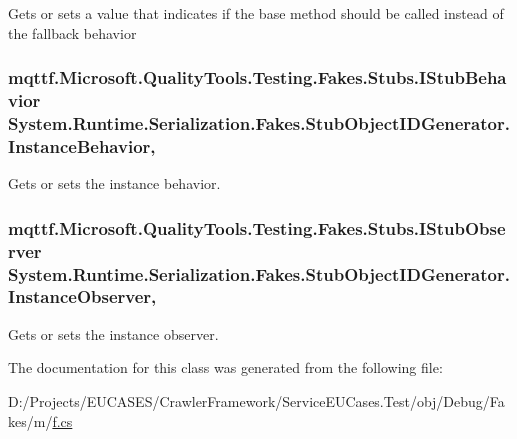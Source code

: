 Gets or sets a value that indicates if the base method should be called instead of the fallback behavior

\hypertarget{class_system_1_1_runtime_1_1_serialization_1_1_fakes_1_1_stub_object_i_d_generator_a65f2233368d97d94e368ef644f011914}{
\subsubsection[{Instance\-Behavior}]{\setlength{\rightskip}{0pt plus 5cm}mqttf.\-Microsoft.\-Quality\-Tools.\-Testing.\-Fakes.\-Stubs.\-I\-Stub\-Behavior System.\-Runtime.\-Serialization.\-Fakes.\-Stub\-Object\-I\-D\-Generator.\-Instance\-Behavior\hspace{0.3cm}{\ttfamily [get]}, {\ttfamily [set]}}}\label{class_system_1_1_runtime_1_1_serialization_1_1_fakes_1_1_stub_object_i_d_generator_a65f2233368d97d94e368ef644f011914}


Gets or sets the instance behavior.

\hypertarget{class_system_1_1_runtime_1_1_serialization_1_1_fakes_1_1_stub_object_i_d_generator_a2ca6d8c4e19b1d65dd3e245b6fafd203}{
\subsubsection[{Instance\-Observer}]{\setlength{\rightskip}{0pt plus 5cm}mqttf.\-Microsoft.\-Quality\-Tools.\-Testing.\-Fakes.\-Stubs.\-I\-Stub\-Observer System.\-Runtime.\-Serialization.\-Fakes.\-Stub\-Object\-I\-D\-Generator.\-Instance\-Observer\hspace{0.3cm}{\ttfamily [get]}, {\ttfamily [set]}}}\label{class_system_1_1_runtime_1_1_serialization_1_1_fakes_1_1_stub_object_i_d_generator_a2ca6d8c4e19b1d65dd3e245b6fafd203}


Gets or sets the instance observer.



The documentation for this class was generated from the following file\-:\begin{DoxyCompactItemize}
\item 
D\-:/\-Projects/\-E\-U\-C\-A\-S\-E\-S/\-Crawler\-Framework/\-Service\-E\-U\-Cases.\-Test/obj/\-Debug/\-Fakes/m/\hyperlink{m_2f_8cs}{f.\-cs}\end{DoxyCompactItemize}
